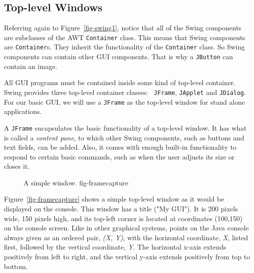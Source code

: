 \subsection{Top-level Windows}

Referring again to Figure~\ref{fig-swing1}, notice that all of the
Swing components are subclasses of the AWT {\tt Container} class.
This means that Swing components are {\tt Container}s. They inherit
the functionality of the {\tt Container} class. So Swing components
can contain other GUI components. That is why a {\tt JButton} can
contain an image.

All GUI programs must be contained inside some kind of top-level
container.  Swing provides three top-level container classes: {\tt
JFrame}, {\tt JApplet} and {\tt JDialog}.  For our basic GUI, we will
use a {\tt JFrame} as the top-level window for stand alone
applications.  

A {\tt JFrame} encapsulates the basic functionality of a top-level
window. It has what is called a {\em content pane}, to which
other Swing components, such as buttons and text fields, can be
added. Also, it comes with enough built-in functionality to respond to
certain basic commands, such as when the user adjusts its
size or closes it.

\begin{figure}[tb]
{A simple window.
} {fig-framecapture}

\end{figure}

Figure~\ref{fig-framecapture} shows a simple top-level window as it
would be displayed on the console. This window has a title ("My
GUI"). It is 200 pixels wide, 150 pixels high, and its top-left corner
is located at coordinates (100,150) on the console screen.  Like in
other graphical systems, points on the Java console always given as an
ordered pair, {\it (X, Y)}, with the horizontal coordinate, {\it X},
listed first, followed by the vertical coordinate, {\it Y}.  
The horizontal x-axis extends positively from left to right,
and the vertical y-axis extends positively from top to bottom.

